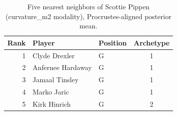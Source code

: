 \begin{table}[htbp]
  \centering\small
  \begin{tabular}{rllc}
    \toprule
    Rank & Player & Position & Archetype \\
    \midrule
    1 & Clyde Drexler & G & 1 \\
    2 & Anfernee Hardaway & G & 1 \\
    3 & Jamaal Tinsley & G & 1 \\
    4 & Marko Jaric & G & 1 \\
    5 & Kirk Hinrich & G & 2 \\
    \bottomrule
  \end{tabular}
  \caption{Five nearest neighbors of Scottie Pippen (curvature_m2 modality), Procrustes-aligned posterior mean.}
  \label{tab:Scottie_Pippen_neighbors_curvature_m2}
\end{table}

